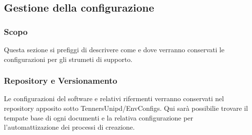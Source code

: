 \subsection{Gestione della configurazione}
\subsubsection{Scopo}
Questa sezione si prefiggi di descrivere come e dove verranno conservati le configurazioni
per gli strumeti di supporto.
\subsubsection{Repository e Versionamento}
Le configurazioni del software e relativi rifermenti verranno conservati nel repository
apposito sotto TennersUnipd/EnvConfigs.
Qui sarà possibilie trovare il tempate base di ogni documenti e la relativa configurazione
per l'automattizazione dei processi di creazione.
